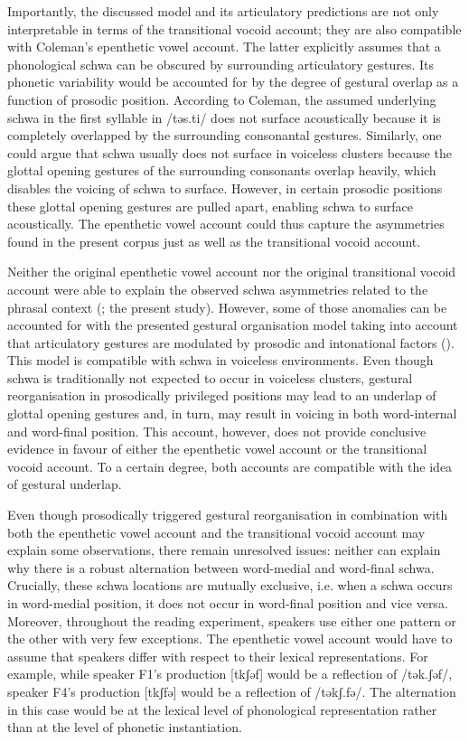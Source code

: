 Importantly, the discussed model and its articulatory predictions are not only interpretable in terms of the transitional vocoid account; they are also compatible with Coleman’s epenthetic vowel account. The latter explicitly assumes that a phonological schwa can be obscured by surrounding articulatory gestures. Its phonetic variability would be accounted for by the degree of gestural overlap as a function of prosodic position. According to Coleman, the assumed underlying schwa in the first syllable in /təs.ti/ does not surface acoustically because it is completely overlapped by the surrounding consonantal gestures. Similarly, one could argue that schwa usually does not surface in voiceless clusters because the glottal opening gestures of the surrounding consonants overlap heavily, which disables the voicing of schwa to surface. However, in certain prosodic positions these glottal opening gestures are pulled apart, enabling schwa to surface acoustically. The epenthetic vowel account could thus capture the asymmetries found in the present corpus just as well as the transitional vocoid account. 

Neither the original epenthetic vowel account nor the original transitional vocoid account were able to explain the observed schwa asymmetries related to the phrasal context (\citealt{Ridouane2008,GordonNafi2012}; the present study). However, some of those anomalies can be accounted for with the presented gestural organisation model taking into account that articulatory gestures are modulated by prosodic and intonational factors (\citealt{ByrdSaltzman2003,Saltzman2008,Goldstein2014}). This model is compatible with schwa in voiceless environments. Even though schwa is traditionally not expected to occur in voiceless clusters, gestural reorganisation in prosodically privileged positions may lead to an underlap of glottal opening gestures and, in turn, may result in voicing in both word-internal and word-final position. This account, however, does not provide conclusive evidence in favour of either the epenthetic vowel account or the transitional vocoid account. To a certain degree, both accounts are compatible with the idea of gestural underlap.   

Even though prosodically triggered gestural reorganisation in combination with both the epenthetic vowel account and the transitional vocoid account may explain some observations, there remain unresolved issues: neither can explain why there is a robust alternation between word-medial and word-final schwa. Crucially, these schwa locations are mutually exclusive, i.e. when a schwa occurs in word-medial position, it does not occur in word-final position and vice versa. Moreover, throughout the reading experiment, speakers use either one pattern or the other with very few exceptions. The epenthetic vowel account would have to assume that speakers differ with respect to their lexical representations. For example, while speaker F1’s production [tkʃəf] would be a reflection of /tək.ʃəf/, speaker F4’s production [tkʃfə] would be a reflection of /təkʃ.fə/. The alternation in this case would be at the lexical level of phonological representation rather than at the level of phonetic instantiation. 

